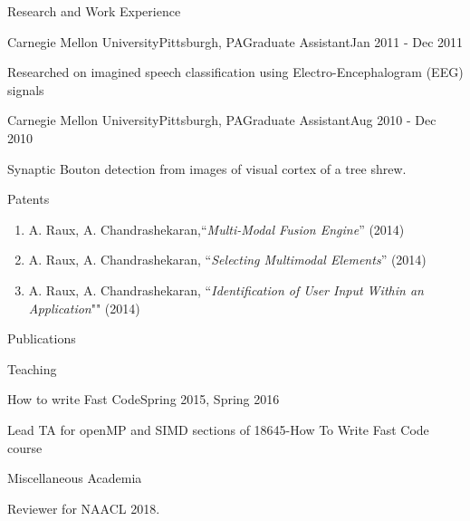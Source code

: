 \documentclass{resume} %
\begin{document}
\begin{rSection}{Research and Work Experience}

\begin{rSubsection}{Carnegie Mellon University}{Pittsburgh, PA}{Graduate Assistant}{Jan 2011 - Dec 2011}
\item Researched on imagined speech classification using Electro-Encephalogram (EEG) signals
\end{rSubsection}


\begin{rSubsection}{Carnegie Mellon University}{Pittsburgh, PA}{Graduate Assistant}{Aug 2010 - Dec 2010}
\item Synaptic Bouton detection from images of visual cortex of a tree shrew. 
\end{rSubsection}
\end{rSection}

\begin{rSection}{Patents}
\begin{enumerate}
\item A. Raux, A. Chandrashekaran,``\emph{Multi-Modal Fusion Engine}'' (2014)
\item A. Raux, A. Chandrashekaran, ``\emph{Selecting Multimodal Elements}'' (2014)
\item A. Raux, A. Chandrashekaran, ``\emph{Identification of User Input Within an Application}"" (2014)
\end{enumerate}

\end{rSection}

\begin{rSection}{Publications}

\end{rSection}
\begin{rSection}{Teaching}
\begin{rSubsection}{How to write Fast Code}{Spring 2015, Spring 2016}{}{}
\item Lead TA for openMP and SIMD sections of 18645-How To Write Fast Code course 
\end{rSubsection}
\end{rSection}

\newpage
\begin{rSection} {Miscellaneous Academia}
\item Reviewer for NAACL 2018.
\end {rSection}
\end{document}
